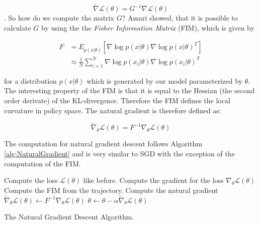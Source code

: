 \[\tilde{\nabla}\mathcal{L}(\theta) = G^{-1}\nabla\mathcal{L}(\theta) \]. 
So how do we compute the matrix $G$? Amari showed, that it is possible to calculate $G$ by using the the \textit{Fisher Information Matrix} (FIM), which is given by 

\begin{align*}
  F &= E_{p(x|\theta)} \left[\nabla \log p(x|\theta) \nabla \log p(x|\theta)^T\right] \\
  &\approx \frac{1}{N} \sum^N_{i=1} \nabla \log p(x_i|\theta) \nabla \log p(x_i|\theta)^T
\end{align*}

for a distribution $p(x|\theta)$ which is generated by our model parameterized by $\theta$. The interesting property of the FIM is that it is equal to the Hessian (the second order derivate) of the KL-divergence. Therefore the FIM defines the local curvature in policy space. The natural gradient is therefore defined as:

\[\tilde{\nabla}_\theta\mathcal{L}(\theta) = F^{-1}\nabla_\theta\mathcal{L}(\theta)\]

The computation for natural gradient descent follows Algorithm \ref{alg:NaturalGradient} and is very similar to SGD with the exception of the computation of the FIM. 

\begin{algorithm}[h!]
  
   {
    Compute the loss $\mathcal{L}(\theta)$ like before. \;
    Compute the gradient for the loss $\nabla_\theta \mathcal{L}(\theta)$ \;
    Compute the FIM from the trajectory. \;
    Compute the natural gradient $\tilde{\nabla}_\theta\mathcal{L}(\theta) \leftarrow F^{-1}\nabla_\theta\mathcal{L}(\theta)$ \;
    $\theta \leftarrow \theta - \alpha \tilde{\nabla}_\theta\mathcal{L}(\theta)$ \;
  }
  
  \caption[The Natural Gradient Descent Algorithm]{The Natural Gradient Descent Algorithm.}\label{alg:NaturalGradient}
 \end{algorithm}


